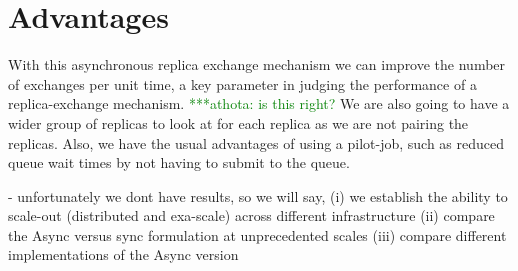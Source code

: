 \documentclass[a4paper,10pt]{article}
\newcommand{\athotanote}[1]{ {\textcolor{green} { ***athota: #1 }}}
\begin{document}
\section{Advantages}
With this asynchronous replica exchange mechanism we can improve the number of exchanges per unit time, a key parameter in judging the performance of a replica-exchange mechanism. \athotanote{is this right? } We are also going to have a wider group of replicas to look at for each replica as we are not pairing the replicas. Also, we have the usual advantages of using a pilot-job, such as reduced queue wait times by not having to submit to the queue. 


- unfortunately we dont have results, so we will say, (i) we establish the
 ability to scale-out (distributed and exa-scale)  across different
 infrastructure (ii) compare the Async versus sync formulation at
 unprecedented scales (iii) compare different implementations  of
 the Async version
 
 
  
 
\end{document}
